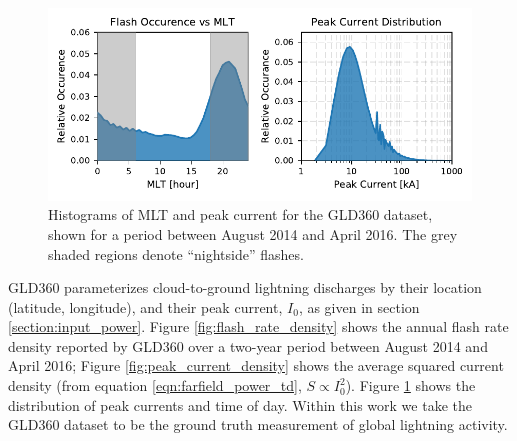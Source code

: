 \begin{figure}[t]
\begin{center}
\includegraphics{figures/MLT_and_IO_distribution.pdf}
\end{center}
\caption[Distributions of peak current and MLT for the GLD360 dataset]{Histograms of MLT and peak current for the GLD360 dataset, shown for a period between August 2014 and April 2016. The grey shaded regions denote ``nightside'' flashes.}
\label{fig:Io_and_MLT}
\end{figure}


GLD360 parameterizes cloud-to-ground lightning discharges by their location (latitude, longitude), and their peak current, $I_0$, as given in section \ref{section:input_power}. Figure \ref{fig:flash_rate_density} shows the annual flash rate density reported by GLD360 over a two-year period between August 2014 and April 2016; Figure \ref{fig:peak_current_density} shows the average squared current density (from equation \eqref{eqn:farfield_power_td}, $S \propto I_0^2$). Figure \ref{fig:Io_and_MLT} shows the distribution of peak currents and time of day. Within this work we take the GLD360 dataset to be the ground truth measurement of global lightning activity.





